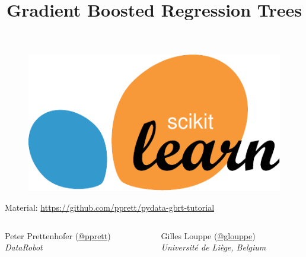 \documentclass[a4paper,presentation]{beamer}
\title{Gradient Boosted Regression Trees}
\date{}
\begin{document}

\begin{frame}

\titlepage

\vspace{-3cm}

\begin{figure}
  \centering
    \includegraphics[scale=.6]{./images/scikit-learn-logo.pdf}
\end{figure}

\vspace{0.2cm}
  \begin{center}
    {\small Material:
    \href{https://github.com/pprett/pydata-gbrtm-tutorial}{https://github.com/pprett/pydata-gbrt-tutorial}}\\
  \end{center}
\vspace{0.2cm}

\begin{columns}[T]
\begin{column}{.48\textwidth}

\centering
Peter Prettenhofer (\href{https://twitter.com/pprett}{@pprett})\\
{\small\it DataRobot}

\end{column}
\begin{column}{.48\textwidth}

\centering
Gilles Louppe (\href{https://twitter.com/glouppe}{@glouppe})\\
{\small\it Université de Liège, Belgium}

\end{column}
\end{columns}


\end{frame}
\end{document}

